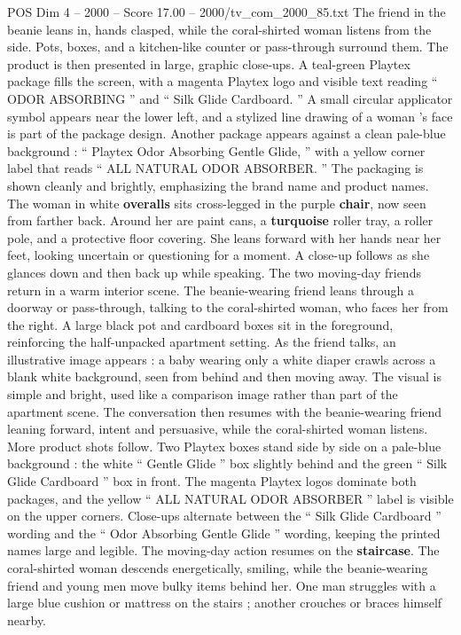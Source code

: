 \begin{textsample}{POS Dim 4 – 2000 – Score 17.00 – 2000/tv\_com\_2000\_85.txt}
The friend in the beanie leans in, hands clasped, while the coral-shirted woman listens from the side.
Pots, boxes, and a kitchen-like counter or pass-through surround them.
The product is then presented in large, graphic close-ups.
A teal-green Playtex package fills the screen, with a magenta Playtex logo and visible text reading “ ODOR ABSORBING ” and “ Silk Glide Cardboard. ” A small circular applicator symbol appears near the lower left, and a stylized line drawing of a woman ’s face is part of the package design.
Another package appears against a clean pale-blue background : “ Playtex Odor Absorbing Gentle Glide, ” with a yellow corner label that reads “ ALL NATURAL ODOR ABSORBER. ” The packaging is shown cleanly and brightly, emphasizing the brand name and product names.
The woman in white \textbf{overalls} sits cross-legged in the purple \textbf{chair}, now seen from farther back.
Around her are paint cans, a \textbf{turquoise} roller tray, a roller pole, and a protective floor covering.
She leans forward with her hands near her feet, looking uncertain or questioning for a moment.
A close-up follows as she glances down and then back up while speaking.
The two moving-day friends return in a warm interior scene.
The beanie-wearing friend leans through a doorway or pass-through, talking to the coral-shirted woman, who faces her from the right.
A large black pot and cardboard boxes sit in the foreground, reinforcing the half-unpacked apartment setting.
As the friend talks, an illustrative image appears : a baby wearing only a white diaper crawls across a blank white background, seen from behind and then moving away.
The visual is simple and bright, used like a comparison image rather than part of the apartment scene.
The conversation then resumes with the beanie-wearing friend leaning forward, intent and persuasive, while the coral-shirted woman listens.
More product shots follow.
Two Playtex boxes stand side by side on a pale-blue background : the white “ Gentle Glide ” box slightly behind and the green “ Silk Glide Cardboard ” box in front.
The magenta Playtex logos dominate both packages, and the yellow “ ALL NATURAL ODOR ABSORBER ” label is visible on the upper corners.
Close-ups alternate between the “ Silk Glide Cardboard ” wording and the “ Odor Absorbing Gentle Glide ” wording, keeping the printed names large and legible.
The moving-day action resumes on the \textbf{staircase}.
The coral-shirted woman descends energetically, smiling, while the beanie-wearing friend and young men move bulky items behind her.
One man struggles with a large blue cushion or mattress on the stairs ; another crouches or braces himself nearby.

\end{textsample}
